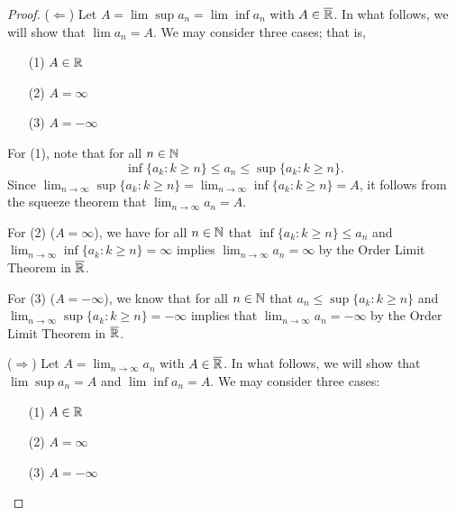 \documentclass[a4paper]{article}
\begin{document}
\begin{proof}
    (\( \Longleftarrow \)) Let \( A = \lim \sup {a}_{n} = \lim \inf {a}_{n} \) with \( A \in \overline{\mathbb{R}} \). In what follows, we will show that \( \lim {a}_{n} = A  \). We may consider three cases; that is,
    \begin{enumerate}
        \item[(1)] \( A \in \mathbb{R}  \)  
        \item[(2)] \( A = \infty  \) 
        \item[(3)] \( A = - \infty  \)
    \end{enumerate}
    For (1), note that for all \( n \in \mathbb{N} \)
    \[  \inf \{ {a}_{k } : k \geq n  \}  \leq {a}_{n} \leq \sup \{ {a}_{k } : k \geq n  \}.  \]
    Since \( \lim_{ n \to \infty  }  \sup \{ {a}_{k } : k \geq n  \}  = \lim_{ n \to \infty  }  \inf \{ {a}_{k } : k \geq n  \}  = A  \), it follows from the squeeze theorem that \( \lim_{ n \to \infty  }  {a}_{n} = A  \).

    For (2) (\( A = \infty  \)), we have for all \( n \in \mathbb{N} \) that \( \inf \{ {a}_{k } : k \geq n  \}  \leq {a}_{n} \) and \( \lim_{ n \to \infty  }  \inf \{ {a}_{k } : k \geq n  \}  = \infty  \) implies \( \lim_{ n \to \infty  } {a}_{n} = \infty  \) by the Order Limit Theorem in \( \overline{\mathbb{R}} \). 

    For (3) (\( A = - \infty  \)), we know that for all \( n \in \mathbb{N} \) that \( {a}_{n} \leq \sup \{ {a}_{k } : k \geq n  \}  \) and \( \lim_{ n \to \infty  }  \sup \{ {a}_{k } : k \geq n  \} = - \infty  \) implies that \( \lim_{ n \to \infty  }  {a}_{n} = - \infty   \) by the Order Limit Theorem in \( \overline{\mathbb{R}} \).
 
    (\( \Longrightarrow \)) Let \( A = \lim_{ n \to \infty  }  {a}_{n}  \) with \( A \in \overline{\mathbb{R}} \). In what follows, we will show that \( \lim \sup  {a}_{n} = A \) and \( \lim \inf {a}_{n} = A  \). We may consider three cases:
    \begin{enumerate}
        \item[(1)] \( A \in \mathbb{R}  \)
        \item[(2)] \( A = \infty  \)
        \item[(3)] \( A = - \infty  \)
    \end{enumerate}


\end{proof}
\end{document}
